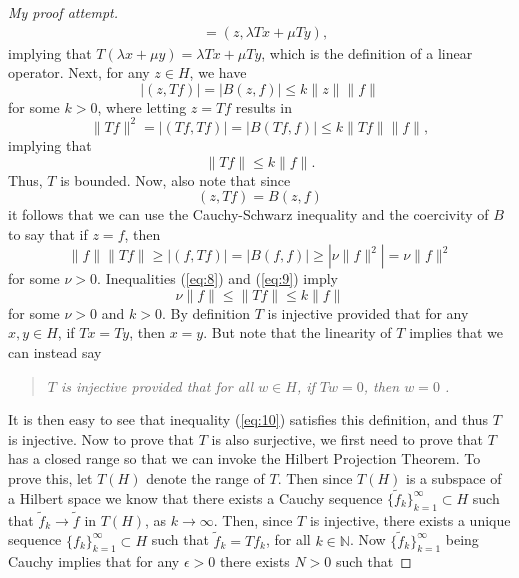 \documentclass[11pt]{article}
\theoremstyle{definition}
\begin{document}
\begin{proof}[My proof attempt]
\begin{equation*}
\begin{aligned}
						 &= (z, \lambda Tx + \mu Ty),
		\end{aligned}
	\end{equation*}
	implying that $T(\lambda x + \mu y) = \lambda Tx + \mu Ty$, which is the definition of a linear operator.
	Next, for any $z \in H$, we have
	\begin{equation*}
		|(z,Tf)| = |B(z,f)| \leq k\|z\|\|f\|
	\end{equation*}
	for some $k>0$, where letting $z = Tf$ results in
	\begin{equation*}
		\|Tf\|^2 = |(Tf,Tf)| = |B(Tf,f)| \leq k\|Tf\|\|f\|,
	\end{equation*}
	implying that
	\begin{equation}
		\label{eq:8}
		\|Tf\| \leq k\|f\|.
	\end{equation}
	Thus, $T$ is bounded. Now, also note that since
	\begin{equation*}
		(z,Tf) = B(z,f)
	\end{equation*}
	it follows that we can use the Cauchy-Schwarz inequality and the coercivity of $B$ to say that if $z=f$, then
	\begin{equation}
		\label{eq:9}
		\|f\|\|Tf\| \geq |(f,Tf)| = |B(f,f)| \geq |\nu \|f\|^2| = \nu \|f\|^2
	\end{equation}
	for some $\nu > 0$. Inequalities (\ref{eq:8}) and (\ref{eq:9}) imply
	\begin{equation}
		\label{eq:10}
		\nu \|f\| \leq \|Tf\| \leq k \|f\|
	\end{equation}
	for some $\nu >0$ and $k >0$.
	By definition $T$ is injective provided that for any $x,y \in H$, if $Tx = Ty$, then $x=y$.
	But note that the linearity of $T$ implies that we can instead say \blockquote{\textit{$T$ is injective provided that
	for all $w \in H$, if $Tw = 0$, then $w = 0$ .}} It is then easy to see that inequality (\ref{eq:10})
	satisfies this definition, and thus $T$ is injective.
	Now to prove that $T$ is also surjective, we first need to prove that $T$ has a closed range so that
	we can invoke the Hilbert Projection Theorem. To prove this, let $T(H)$ denote the range of $T$.
	Then since $T(H)$ is a subspace of a Hilbert space we know that there exists a Cauchy sequence $\{\tilde{f}_k\}_{k=1}^{\infty} \subset H$
	such that $\tilde{f}_k \rightarrow \tilde{f}$ in $T(H)$, as $k\rightarrow \infty$. Then, since $T$ is injective, there exists a unique
	sequence $\{f_k\}_{k=1}^{\infty} \subset H$ such that $\tilde{f}_k = Tf_k$, for all $k \in \mathbb{N}$. Now $\{\tilde{f}_k\}_{k=1}^{\infty}$
	being Cauchy implies that for any $\epsilon > 0$ there exists $N >0$ such that

\end{proof}
\end{document}
